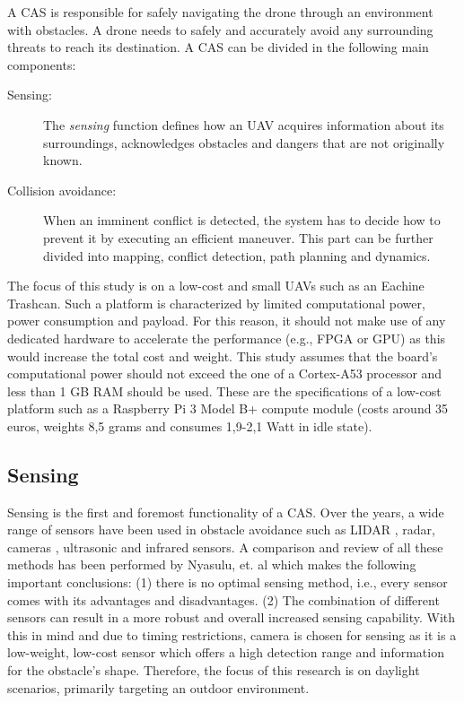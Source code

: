 A \ac{CAS} is responsible for safely navigating the drone through an environment with obstacles. A drone needs to safely and accurately avoid any surrounding threats to reach its destination. A \acs{CAS} can be divided in the following main components:

\begin{description}
	\item[Sensing:] The \textit{sensing} function defines how an \ac{UAV} acquires information about its surroundings, acknowledges obstacles and dangers that are not originally known. 
	\item[Collision avoidance:] When an imminent conflict is detected, the system has to decide how to prevent it by executing an efficient maneuver. This part can be further divided into mapping, conflict detection, path planning and dynamics.
\end{description}

The focus of this study is on a low-cost and small \acp{UAV} such as an Eachine Trashcan. Such a platform is characterized by limited computational power, power consumption and payload. For this reason, it should not make use of any dedicated hardware to accelerate the performance (e.g., FPGA or GPU) as this would increase the total cost and weight. This study assumes that the board's computational power should not exceed the one of a Cortex-A53 processor and less than 1 GB RAM should be used. These are the specifications of a low-cost platform such as a Raspberry Pi 3 Model B+ compute module (costs around 35 euros, weights 8,5 grams and consumes 1,9-2,1 Watt in idle state). 

\subsection*{Sensing}

Sensing is the first and foremost functionality of a \ac{CAS}. Over the years, a wide range of sensors have been used in obstacle avoidance such as LIDAR \cite{Xu2017} \cite{Lin2011} \cite{Scherer2008}, radar\cite{Parappat2014}, cameras \cite{Lenz2012} \cite{Lange2009} \cite{Barrientos2011a}, ultrasonic \cite{Bhardwaj2015} \cite{Gageik2012} \cite{Guerra2009} and infrared \cite{Choi2017} \cite{Gageik2015} sensors. A comparison and review of all these methods has been performed by Nyasulu, et. al \cite{DenzelNyasulu2018} which makes the following important conclusions: (1) there is no optimal sensing method, i.e., every sensor comes with its advantages and disadvantages. (2) The combination of different sensors can result in a more robust and overall increased sensing capability. With this in mind and due to timing restrictions, camera is chosen for sensing as it is a low-weight, low-cost sensor which offers a high detection range and information for the obstacle's shape. Therefore, the focus of this research is on daylight scenarios, primarily targeting an outdoor environment.

